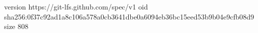 version https://git-lfs.github.com/spec/v1
oid sha256:0f37c92ad1a8c106a578a0cb3641dbe0a6094eb36bc15eed53b9b04e9cfb08d9
size 808
